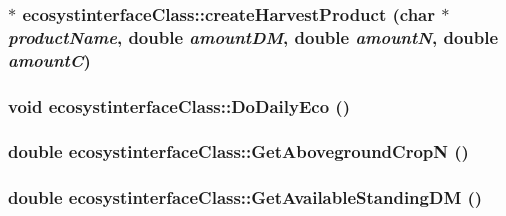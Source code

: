 \label{classecosystinterface_class_a6e82d778908d98c7d1f8049ae69cefcd}
\hypertarget{classecosystinterface_class_a2097c450fa14dbe445cfdc6c8c223b60}{
\subsubsection[{createHarvestProduct}]{$\ast$ ecosystinterfaceClass::createHarvestProduct (char $\ast$ {\em productName}, \/  double {\em amountDM}, \/  double {\em amountN}, \/  double {\em amountC})}}
\label{classecosystinterface_class_a2097c450fa14dbe445cfdc6c8c223b60}
\hypertarget{classecosystinterface_class_a5419110219a9ddfc05702edb8e256066}{
\subsubsection[{DoDailyEco}]{\setlength{\rightskip}{0pt plus 5cm}void ecosystinterfaceClass::DoDailyEco ()}}
\label{classecosystinterface_class_a5419110219a9ddfc05702edb8e256066}
\hypertarget{classecosystinterface_class_a5e3e01abfca3ef0004505bab44b29231}{
\subsubsection[{GetAbovegroundCropN}]{\setlength{\rightskip}{0pt plus 5cm}double ecosystinterfaceClass::GetAbovegroundCropN ()}}
\label{classecosystinterface_class_a5e3e01abfca3ef0004505bab44b29231}
\hypertarget{classecosystinterface_class_af71aa19f5610ccde073c4b498a449e62}{
\subsubsection[{GetAvailableStandingDM}]{\setlength{\rightskip}{0pt plus 5cm}double ecosystinterfaceClass::GetAvailableStandingDM ()}}
